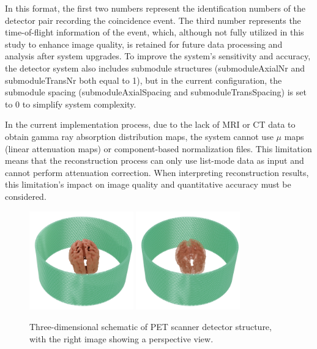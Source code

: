 \documentclass[
reprint,
superscriptaddress,
nofootinbib,
amsmath,amssymb,
aps,
prd,
]{revtex4-2}
\begin{document}
In this format, the first two numbers represent the identification numbers of the detector pair recording the coincidence event. The third number represents the time-of-flight information of the event, which, although not fully utilized in this study to enhance image quality, is retained for future data processing and analysis after system upgrades. To improve the system's sensitivity and accuracy, the detector system also includes submodule structures (submoduleAxialNr and submoduleTransNr both equal to 1), but in the current configuration, the submodule spacing (submoduleAxialSpacing and submoduleTransSpacing) is set to 0 to simplify system complexity.

In the current implementation process, due to the lack of MRI or CT data to obtain gamma ray absorption distribution maps, the system cannot use $\mu$ maps (linear attenuation maps) or component-based normalization files. This limitation means that the reconstruction process can only use list-mode data as input and cannot perform attenuation correction. When interpreting reconstruction results, this limitation's impact on image quality and quantitative accuracy must be considered.

\begin{figure}[htbp]
\centering
\vspace{-0.2cm}
\includegraphics[width=0.4\textwidth]{Images/Thehumanbrainisnotmissing3}
\includegraphics[width=0.4\textwidth]{Images/Thehumanbrainisnotmissing4}
\vspace{-0.2cm}
\caption{Three-dimensional schematic of PET scanner detector structure, with the right image showing a perspective view.}
\vspace{-0.2cm}
\label{fig:pet_structures}
\end{figure}
\end{document}
